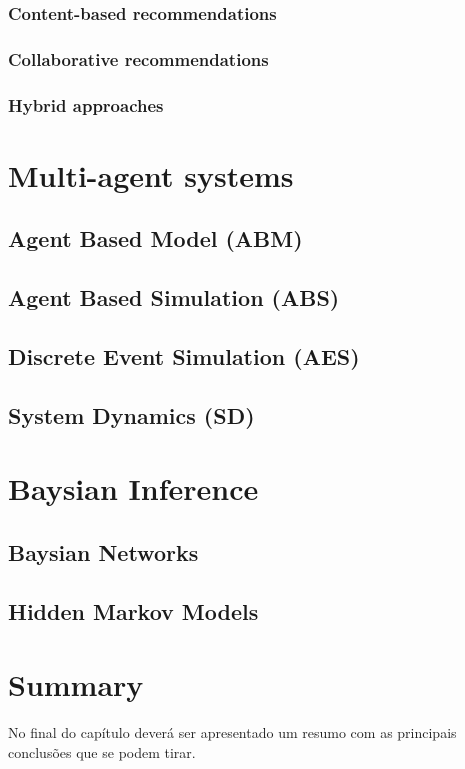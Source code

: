 \cite{Adomavicius2005}

\subsubsection{Content-based recommendations}

\subsubsection{Collaborative recommendations}

\subsubsection{Hybrid approaches}

\section{Multi-agent systems}

\subsection{Agent Based Model (ABM)}

\subsection{Agent Based Simulation (ABS)}

\cite{Siebers2010}

\subsection{Discrete Event Simulation (AES)}

\cite{Siebers2010}

\subsection{System Dynamics (SD)}

\cite{Siebers2010}

\section{Baysian Inference}

\subsection{Baysian Networks}

\subsection{Hidden Markov Models}

\cite{Rabiner1989}

\section{Summary}

No final do capítulo deverá ser apresentado um resumo com as 
principais conclusões que se podem tirar. 
